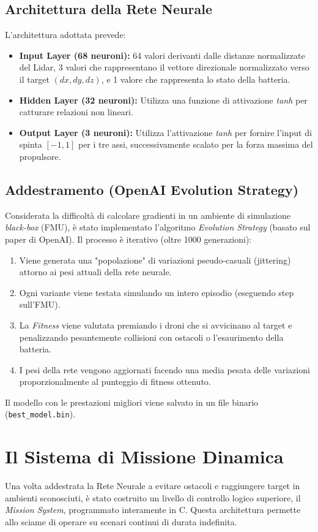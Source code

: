 ﻿\documentclass[12pt,a4paper]{article}
\begin{document}
\subsection{Architettura della Rete Neurale}
L'architettura adottata prevede:
\begin{itemize}
    \item \textbf{Input Layer (68 neuroni):} 64 valori derivanti dalle distanze normalizzate del Lidar, 3 valori che rappresentano il vettore direzionale normalizzato verso il target $(dx, dy, dz)$, e 1 valore che rappresenta lo stato della batteria.
    \item \textbf{Hidden Layer (32 neuroni):} Utilizza una funzione di attivazione \textit{tanh} per catturare relazioni non lineari.
    \item \textbf{Output Layer (3 neuroni):} Utilizza l'attivazione \textit{tanh} per fornire l'input di spinta $[-1, 1]$ per i tre assi, successivamente scalato per la forza massima del propulsore.
\end{itemize}

\subsection{Addestramento (OpenAI Evolution Strategy)}
Considerata la difficoltà di calcolare gradienti in un ambiente di simulazione \textit{black-box} (FMU), è stato implementato l'algoritmo \textit{Evolution Strategy} (basato sul paper di OpenAI).
Il processo è iterativo (oltre 1000 generazioni):
\begin{enumerate}
    \item Viene generata una "popolazione" di variazioni pseudo-casuali (jittering) attorno ai pesi attuali della rete neurale.
    \item Ogni variante viene testata simulando un intero episodio (eseguendo step sull'FMU).
    \item La \textit{Fitness} viene valutata premiando i droni che si avvicinano al target e penalizzando pesantemente collisioni con ostacoli o l'esaurimento della batteria.
    \item I pesi della rete vengono aggiornati facendo una media pesata delle variazioni proporzionalmente al punteggio di fitness ottenuto.
\end{enumerate}
Il modello con le prestazioni migliori viene salvato in un file binario (\texttt{best\_model.bin}).

\section{Il Sistema di Missione Dinamica}
Una volta addestrata la Rete Neurale a evitare ostacoli e raggiungere target in ambienti sconosciuti, è stato costruito un livello di controllo logico superiore, il \textit{Mission System}, programmato interamente in C.
Questa architettura permette allo sciame di operare su scenari continui di durata indefinita.
\end{document}
